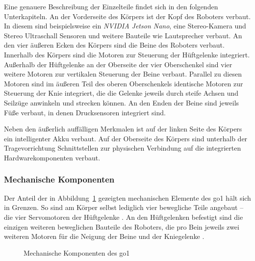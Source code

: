 \noindent Eine genauere Beschreibung der Einzelteile findet sich in den folgenden Unterkapiteln.
An der Vorderseite des Körpers ist der Kopf  des Roboters verbaut.
In diesem sind beispielsweise ein \emph{NVIDIA Jetson Nano}, eine Stereo-Kamera und Stereo Ultraschall Sensoren
und weitere Bauteile wie Lautsprecher verbaut.
An den vier äußeren Ecken des Körpers sind die Beine des Roboters verbaut.
Innerhalb des Körpers sind die Motoren zur Steuerung der Hüftgelenke  integriert.
Außerhalb der Hüftgelenke an der Oberseite der vier Oberschenkel  sind vier weitere Motoren
zur vertikalen Steuerung der Beine verbaut.
Parallel zu diesen Motoren sind im äußeren Teil des oberen Oberschenkels identische Motoren
zur Steuerung der Knie  integriert, die die Gelenke jeweils durch steife Achsen und Seilzüge
anwinkeln und strecken können.
An den Enden der Beine sind jeweils Füße  verbaut, in denen Drucksensoren integriert sind.

Neben den äußerlich auffälligen Merkmalen ist auf der linken Seite des Körpers ein intelligenter Akku
 verbaut.
Auf der Oberseite des Körpers sind unterhalb der Tragevorrichtung  Schnittstellen  zur physischen
Verbindung auf die integrierten Hardwarekomponenten verbaut.


\subsubsection{Mechanische Komponenten}

Der Anteil der in Abbildung~\ref{fig:mechanische_komponenten} gezeigten mechanischen Elemente des \gls{go1} hält sich in Grenzen.
So sind am Körper selbst lediglich vier bewegliche Teile angebaut -- die vier Servomotoren
der Hüftgelenke .
An den Hüftgelenken befestigt sind die einzigen weiteren beweglichen Bauteile des Roboters,
die pro Bein jeweils zwei weiteren Motoren für die Neigung der Beine  und der Kniegelenke .

\begin{figure}[h]
    \caption[Mechanische Komponenten des Go1]{Mechanische Komponenten des \gls{go1}}\label{fig:mechanische_komponenten}
\end{figure}


